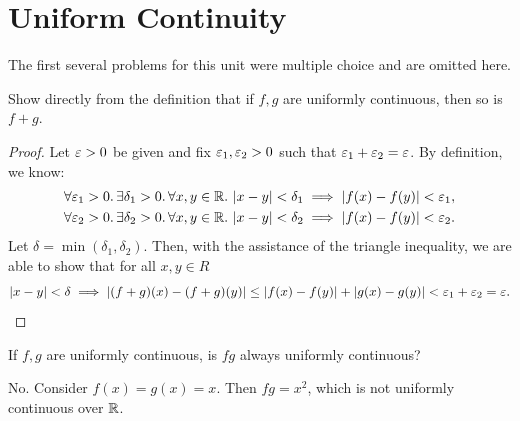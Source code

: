 \section{Uniform Continuity}

\begin{callout}
  The first several problems for this unit were multiple choice
  and are omitted here.
\end{callout}

\begin{problem}
  Show directly from the definition that if $f, g$ are uniformly continuous,
  then so is $f+g$.

  \begin{proof}
    Let $\varepsilon > 0$ be given and fix $\varepsilon_{1}, \varepsilon_{2} > 0$ such that
    $\varepsilon_{1} + \varepsilon_{2} = \varepsilon$. By definition, 
    we know:
    \begin{align*}
      \forall \varepsilon_{1} > 0.\, \exists \delta_{1} > 0.\, \forall x, y \in \mathbb{R}.\, \left\lvert x - y \right\rvert < \delta_{1} \implies \left\lvert f(x) - f(y) \right\rvert < \varepsilon_{1},\\
      \forall \varepsilon_{2} > 0.\, \exists \delta_{2} > 0.\, \forall x, y \in \mathbb{R}.\, \left\lvert x - y \right\rvert < \delta_{2} \implies \left\lvert f(x) - f(y) \right\rvert < \varepsilon_{2}.
    \end{align*}
    Let $\delta = \min{(\delta_{1}, \delta_{2})}$. Then, with the assistance
    of the triangle inequality, we are able to show that for all $x, y \in R$
    \[
      \left\lvert x - y \right\rvert < \delta \implies \left\lvert (f+g)(x) - (f+g)(y) \right\rvert \leq \left\lvert f(x) - f(y) \right\rvert + \left\lvert g(x) - g(y) \right\rvert < \varepsilon_{1} + \varepsilon_{2} = \varepsilon.
    \]
  \end{proof}
\end{problem}

\begin{problem}
  If $f, g$ are uniformly continuous, is $fg$ always uniformly continuous?
  \vspace{\baselineskip}

  No. Consider $f(x) = g(x) = x$. Then $fg = x^{2}$, which is not uniformly continuous over $\mathbb{R}$.

\end{problem}

